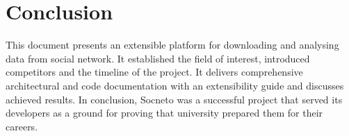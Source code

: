 \chapter{Conclusion}

This document presents an extensible platform for downloading and analysing data from social network. It established the field of interest, introduced competitors and the timeline of the project. It delivers comprehensive architectural and code documentation with an extensibility guide and discusses achieved results. In conclusion, Socneto was a successful project that served its developers as a ground for proving that university prepared them for their careers.